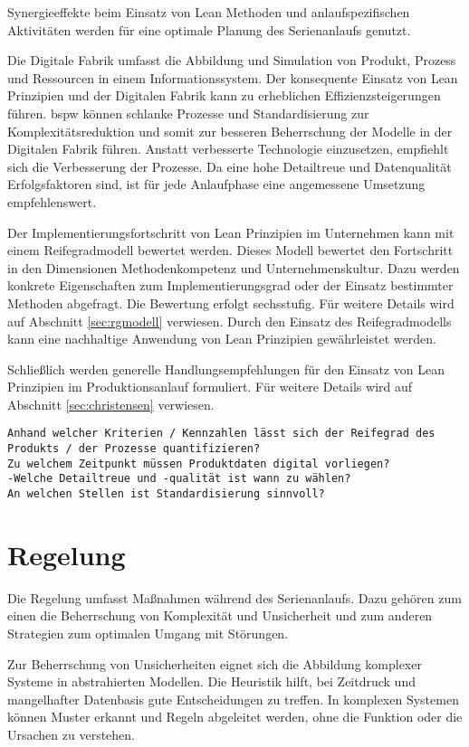 Synergieeffekte beim Einsatz von Lean Methoden und anlaufspezifischen Aktivitäten werden für eine optimale Planung des Serienanlaufs genutzt. 

Die Digitale Fabrik umfasst die Abbildung und Simulation von Produkt, Prozess und Ressourcen in einem Informationssystem. 
Der konsequente Einsatz von Lean Prinzipien und der Digitalen Fabrik kann zu erheblichen Effizienzsteigerungen führen. \Gls{bspw} können schlanke Prozesse und Standardisierung zur Komplexitätsreduktion und somit zur besseren Beherrschung der Modelle in der Digitalen Fabrik führen. Anstatt verbesserte Technologie einzusetzen, empfiehlt sich die Verbesserung der Prozesse. Da eine hohe Detailtreue und Datenqualität Erfolgsfaktoren sind, ist für jede Anlaufphase eine angemessene Umsetzung empfehlenswert. 

Der Implementierungsfortschritt von Lean Prinzipien im Unternehmen kann mit einem Reifegradmodell bewertet werden. Dieses Modell bewertet den Fortschritt in den Dimensionen Methodenkompetenz und Unternehmenskultur. Dazu werden konkrete Eigenschaften zum Implementierungsgrad oder der Einsatz bestimmter Methoden abgefragt. Die Bewertung erfolgt sechsstufig. Für weitere Details wird auf Abschnitt \ref{sec:rgmodell} verwiesen. Durch den Einsatz des Reifegradmodells kann eine nachhaltige Anwendung von Lean Prinzipien gewährleistet werden. 

Schließlich werden generelle Handlungsempfehlungen für den Einsatz von Lean Prinzipien im Produktionsanlauf formuliert. Für weitere Details wird auf Abschnitt \ref{sec:christensen} verwiesen.

\begin{verbatim}
Anhand welcher Kriterien / Kennzahlen lässt sich der Reifegrad des 
Produkts / der Prozesse quantifizieren? 
Zu welchem Zeitpunkt müssen Produktdaten digital vorliegen? 
-Welche Detailtreue und -qualität ist wann zu wählen?
An welchen Stellen ist Standardisierung sinnvoll? 
\end{verbatim}

\section{Regelung}

Die Regelung umfasst Maßnahmen während des Serienanlaufs. Dazu gehören zum einen die Beherrschung von Komplexität und Unsicherheit und zum anderen Strategien zum optimalen Umgang mit Störungen. 

Zur Beherrschung von Unsicherheiten eignet sich die Abbildung komplexer Systeme in abstrahierten Modellen. Die Heuristik hilft, bei Zeitdruck und mangelhafter Datenbasis gute Entscheidungen zu treffen. In komplexen Systemen können Muster erkannt und Regeln abgeleitet werden, ohne die Funktion oder die Ursachen zu verstehen. 

